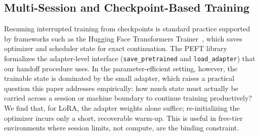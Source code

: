 \documentclass[11pt, a4paper]{article}
\begin{document}
\subsection{Multi-Session and Checkpoint-Based Training}
Resuming interrupted training from checkpoints is standard practice supported by frameworks such as the Hugging Face Transformers Trainer~\cite{wolf2020}, which saves optimizer and scheduler state for exact continuation. The PEFT library~\cite{peft2022} formalizes the adapter-level interface (\texttt{save\_pretrained} and \texttt{load\_adapter}) that our handoff procedure uses. In the parameter-efficient setting, however, the trainable state is dominated by the small adapter, which raises a practical question this paper addresses empirically: how much state must actually be carried across a session or machine boundary to continue training productively? We find that, for LoRA, the adapter weights alone suffice; re-initializing the optimizer incurs only a short, recoverable warm-up. This is useful in free-tier environments where session limits, not compute, are the binding constraint.
\end{document}
